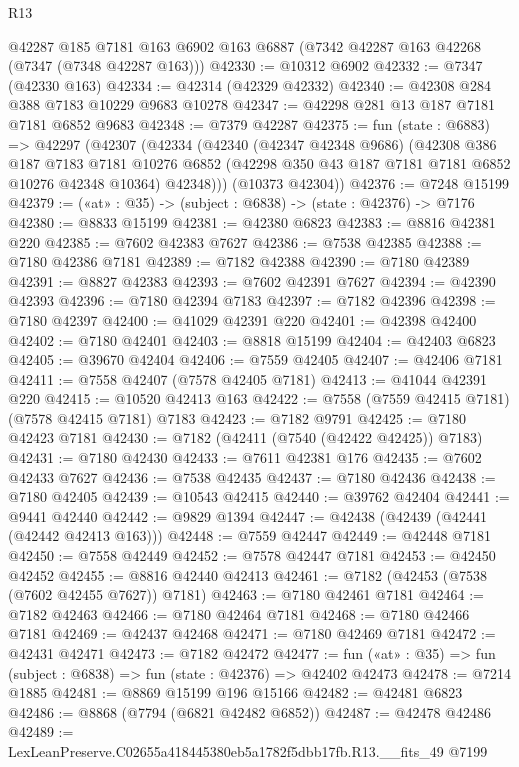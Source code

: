 \begin{lexlean}{R13}
\begin{coremodule}
    @42287
    @185
    @7181
    @163
    @6902
    @163
    @6887
    (@7342 @42287 @163 @42268 (@7347 (@7348 @42287 @163)))
@42330 := @10312 @6902
@42332 := @7347 (@42330 @163)
@42334 := @42314 (@42329 @42332)
@42340 := @42308 @284 @388 @7183 @10229 @9683 @10278
@42347 := @42298 @281 @13 @187 @7181 @7181 @6852 @9683
@42348 := @7379 @42287
@42375 := fun (state : @6883) =>
  @42297
    (@42307
      (@42334
        (@42340
          (@42347 @42348 @9686)
          (@42308
            @386
            @187
            @7183
            @7181
            @10276
            @6852
            (@42298 @350 @43 @187 @7181 @7181 @6852 @10276 @42348 @10364)
            @42348)))
      (@10373 @42304))
@42376 := @7248 @15199
@42379 := («at» : @35) -> (subject : @6838) -> (state : @42376) -> @7176
@42380 := @8833 @15199
@42381 := @42380 @6823
@42383 := @8816 @42381 @220
@42385 := @7602 @42383 @7627
@42386 := @7538 @42385
@42388 := @7180 @42386 @7181
@42389 := @7182 @42388
@42390 := @7180 @42389
@42391 := @8827 @42383
@42393 := @7602 @42391 @7627
@42394 := @42390 @42393
@42396 := @7180 @42394 @7183
@42397 := @7182 @42396
@42398 := @7180 @42397
@42400 := @41029 @42391 @220
@42401 := @42398 @42400
@42402 := @7180 @42401
@42403 := @8818 @15199
@42404 := @42403 @6823
@42405 := @39670 @42404
@42406 := @7559 @42405
@42407 := @42406 @7181
@42411 := @7558 @42407 (@7578 @42405 @7181)
@42413 := @41044 @42391 @220
@42415 := @10520 @42413 @163
@42422 := @7558 (@7559 @42415 @7181) (@7578 @42415 @7181) @7183
@42423 := @7182 @9791
@42425 := @7180 @42423 @7181
@42430 := @7182 (@42411 (@7540 (@42422 @42425)) @7183)
@42431 := @7180 @42430
@42433 := @7611 @42381 @176
@42435 := @7602 @42433 @7627
@42436 := @7538 @42435
@42437 := @7180 @42436
@42438 := @7180 @42405
@42439 := @10543 @42415
@42440 := @39762 @42404
@42441 := @9441 @42440
@42442 := @9829 @1394
@42447 := @42438 (@42439 (@42441 (@42442 @42413 @163)))
@42448 := @7559 @42447
@42449 := @42448 @7181
@42450 := @7558 @42449
@42452 := @7578 @42447 @7181
@42453 := @42450 @42452
@42455 := @8816 @42440 @42413
@42461 := @7182 (@42453 (@7538 (@7602 @42455 @7627)) @7181)
@42463 := @7180 @42461 @7181
@42464 := @7182 @42463
@42466 := @7180 @42464 @7181
@42468 := @7180 @42466 @7181
@42469 := @42437 @42468
@42471 := @7180 @42469 @7181
@42472 := @42431 @42471
@42473 := @7182 @42472
@42477 := fun («at» : @35) => fun (subject : @6838) => fun (state : @42376) => @42402 @42473
@42478 := @7214 @1885
@42481 := @8869 @15199 @196 @15166
@42482 := @42481 @6823
@42486 := @8868 (@7794 (@6821 @42482 @6852))
@42487 := @42478 @42486
@42489 := LexLeanPreserve.C02655a418445380eb5a1782f5dbb17fb.R13.__fits_49 @7199

\end{coremodule}
\end{lexlean}
